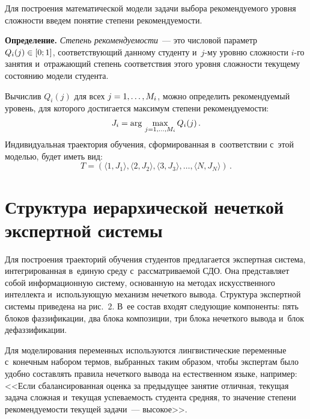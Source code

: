 \begin{multicols}{2}
  Для построения математической модели задачи выбора рекомендуемого 
уровня сложности введем понятие степени рекомендуемости.
  
  \smallskip
  
  \noindent
  \textbf{Определение.} \textit{Степень рекомендуемости}~--- это чис\-ловой 
параметр~$Q_i(j)\hm\in [0;1]$, соответствующий данному студенту и~$j$-му 
уровню сложности $i$-го занятия и~отражающий степень соответствия этого 
уровня сложности текущему состоянию модели студента. 
  
  Вычислив $Q_i(j)$ для всех $j\hm= 1,\ldots, M_i$, \mbox{можно} определить 
рекомендуемый уровень, для кото\-ро\-го достигается максимум степени 
ре\-ко\-мен\-ду\-емости:\\[-8pt] 
$$
J_i\hm=\mathrm{arg}\,\max\limits_{j=1,\ldots, M_i} Q_i(j)\,. 
$$
Индивидуальная траектория обучения, сформированная в~соответствии с~этой 
моделью, будет иметь вид:\\[-12pt]
$$
T= \left(\langle 1,J_1\rangle, \langle 2,J_2\rangle, 
\langle 3,J_3\rangle, \ldots, \langle N, J_N\rangle\right)\,.
$$

\vspace*{-10pt}
  
\section{Структура иерархической нечеткой экспертной системы}
  
  Для построения траекторий обучения студентов предлагается экспертная 
система, интегрированная в~единую среду с~рассматриваемой СДО. Она 
представляет собой информационную систему, основанную на методах 
искусственного интеллекта и~использующую механизм нечеткого вывода. 
Структура экспертной системы приведена на рис.~2. В~ее состав входят 
следующие компоненты: пять блоков фаззификации, два блока композиции, 
три блока нечеткого вывода и~блок дефаззификации. 


  Для моделирования переменных используются лингвистические переменные с~конечным набором термов, выбранных таким образом, чтобы экспертам было 
удобно составлять правила нечеткого вывода на естественном языке, например: 
<<Если сбалансированная оценка за предыдущее занятие отличная, текущая 
задача сложная и~текущая успеваемость студента средняя, то значение степени 
рекомендуемости текущей задачи~--- высокое>>. 

\begin{figure*} %
   \vspace*{1pt}
\begin{center}
\mbox{%
\epsfxsize=161.261mm
}
\end{center}
\vspace*{-9pt}
  \end{figure*}
  

\end{multicols}
